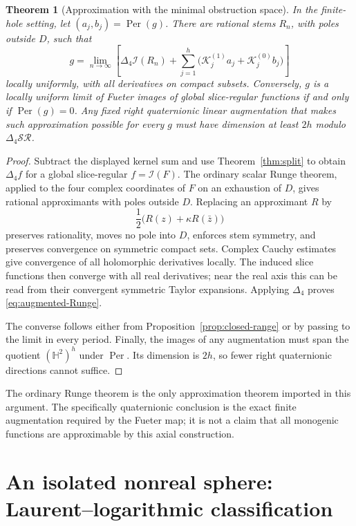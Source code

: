 \documentclass[11pt,a4paper]{article}
\numberwithin{equation}{section}
\newtheorem{theorem}{Theorem}[section]
\theoremstyle{definition}
\theoremstyle{remark}
\newcommand{\HH}{\mathbb H}
\newcommand{\SR}{\mathcal{SR}}
\newcommand{\cI}{\mathcal I}
\newcommand{\lap}{\Delta_4}
\newcommand{\Per}{\operatorname{Per}}
\begin{document}
\begin{theorem}[Approximation with the minimal obstruction space]
\label{thm:Runge}
In the finite-hole setting, let $(a_j,b_j)=\Per(g)$. There are rational stems
$R_n$, with poles outside $D$, such that
\begin{equation}\label{eq:augmented-Runge}
 g=\lim_{n\to\infty}\left[
   \lap\cI(R_n)+\sum_{j=1}^h
   \bigl(\mathcal K_j^{(1)}a_j+\mathcal K_j^{(0)}b_j\bigr)\right]
\end{equation}
locally uniformly, with all derivatives on compact subsets. Conversely, $g$
is a locally uniform limit of Fueter images of global slice-regular functions
if and only if $\Per(g)=0$. Any fixed right quaternionic linear augmentation
that makes such approximation possible for every $g$ must have dimension at
least $2h$ modulo $\lap\SR$.
\end{theorem}
\begin{proof}
Subtract the displayed kernel sum and use Theorem~\ref{thm:split} to obtain
$\lap f$ for a global slice-regular $f=\cI(F)$. The ordinary scalar Runge
theorem, applied to the four complex coordinates of $F$ on an exhaustion of
$D$, gives rational approximants with poles outside $D$. Replacing an
approximant $R$ by
\[
 \frac12\bigl(R(z)+\kappa R(\bar z)\bigr)
\]
preserves rationality, moves no pole into $D$, enforces stem symmetry, and
preserves convergence on symmetric compact sets. Complex Cauchy estimates give
convergence of all holomorphic derivatives locally. The induced slice
functions then converge with all real derivatives; near the real axis this
can be read from their convergent symmetric Taylor expansions. Applying $\lap$
proves \eqref{eq:augmented-Runge}.

The converse follows either from Proposition~\ref{prop:closed-range} or by
passing to the limit in every period. Finally, the images of any augmentation
must span the quotient $(\HH^2)^h$ under $\Per$. Its dimension is $2h$, so
fewer right quaternionic directions cannot suffice.
\end{proof}

The ordinary Runge theorem is the only approximation theorem imported in this
argument. The specifically quaternionic conclusion is the exact finite
augmentation required by the Fueter map; it is not a claim that all monogenic
functions are approximable by this axial construction.

\section{An isolated nonreal sphere: Laurent--logarithmic classification}
\label{sec:singularities}
\end{document}

